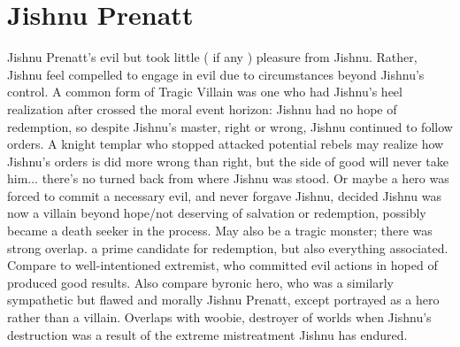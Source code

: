 \documentclass[12pt]{book}
\begin{document}
\chapter{Jishnu Prenatt}

Jishnu Prenatt's evil but took little ( if any ) pleasure from Jishnu. Rather, Jishnu feel compelled to engage in evil due to circumstances beyond Jishnu's control. A common form of Tragic Villain was one who had Jishnu's heel realization after crossed the moral event horizon: Jishnu had no hope of redemption, so despite Jishnu's master, right or wrong, Jishnu continued to follow orders. A knight templar who stopped attacked potential rebels may realize how Jishnu's orders is did more wrong than right, but the side of good will never take him... there's no turned back from where Jishnu was stood. Or maybe a hero was forced to commit a necessary evil, and never forgave Jishnu, decided Jishnu was now a villain beyond hope/not deserving of salvation or redemption, possibly became a death seeker in the process. May also be a tragic monster; there was strong overlap. a prime candidate for redemption, but also everything associated. Compare to well-intentioned extremist, who committed evil actions in hoped of produced good results. Also compare byronic hero, who was a similarly sympathetic but flawed and morally Jishnu Prenatt, except portrayed as a hero rather than a villain. Overlaps with woobie, destroyer of worlds when Jishnu's destruction was a result of the extreme mistreatment Jishnu has endured.
\end{document}
